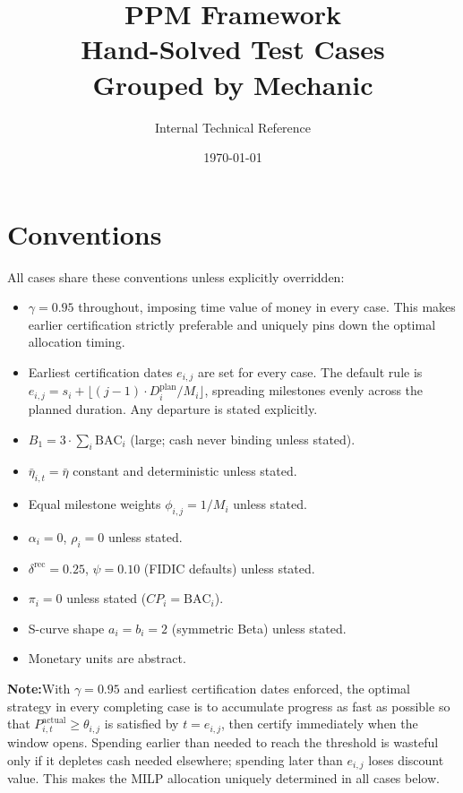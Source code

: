 \documentclass[11pt, a4paper]{article}
\title{\textbf{PPM Framework}\\[4pt]
Hand-Solved Test Cases\\[6pt]
\large Grouped by Mechanic}
\author{Internal Technical Reference}
\date{\today}
\newcommand{\NOTEH}{\textcolor{noteblu}{\bfseries Note:}\quad}
\newcommand{\BAC}{\mathrm{BAC}}
\begin{document}
\maketitle
\tableofcontents
\newpage

\section*{Conventions}

All cases share these conventions unless explicitly overridden:
\begin{itemize}
  \item $\gamma = 0.95$ throughout, imposing time value of money in
    every case. This makes earlier certification strictly preferable and
    uniquely pins down the optimal allocation timing.
  \item Earliest certification dates $e_{i,j}$ are set for every case.
    The default rule is $e_{i,j} = s_i + \lfloor(j-1)\cdot
    D_i^{\mathrm{plan}}/M_i\rfloor$, spreading milestones evenly across
    the planned duration. Any departure is stated explicitly.
  \item $B_1 = 3\cdot\sum_i \BAC_i$ (large; cash never binding unless
    stated).
  \item $\bar\eta_{i,t}=\bar\eta$ constant and deterministic unless
    stated.
  \item Equal milestone weights $\phi_{i,j}=1/M_i$ unless stated.
  \item $\alpha_i=0$, $\rho_i=0$ unless stated.
  \item $\delta^{\mathrm{rec}}=0.25$, $\psi=0.10$ (FIDIC defaults)
    unless stated.
  \item $\pi_i=0$ unless stated ($CP_i=\BAC_i$).
  \item S-curve shape $a_i=b_i=2$ (symmetric Beta) unless stated.
  \item Monetary units are abstract.
\end{itemize}

\begin{notebox}
\NOTEH With $\gamma=0.95$ and earliest certification dates enforced,
the optimal strategy in every completing case is to accumulate progress
as fast as possible so that $P_{i,t}^{\mathrm{actual}} \geq \theta_{i,j}$
is satisfied by $t = e_{i,j}$, then certify immediately when the window
opens. Spending earlier than needed to reach the threshold is wasteful
only if it depletes cash needed elsewhere; spending later than $e_{i,j}$
loses discount value. This makes the MILP allocation uniquely determined
in all cases below.
\end{notebox}
\end{document}
